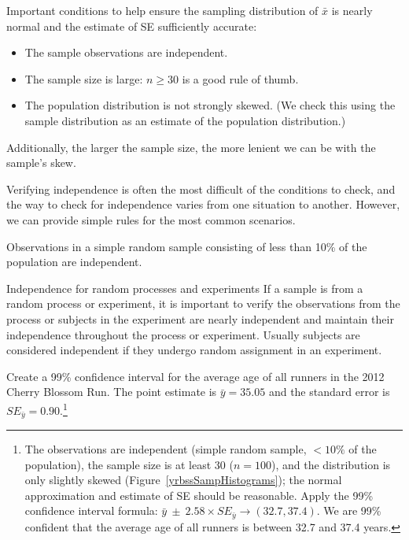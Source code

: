 \begin{termBox}{
Important conditions to help ensure the sampling distribution of $\bar{x}$ is nearly normal and the estimate of SE sufficiently accurate:
\begin{itemize}
\setlength{\itemsep}{0mm}
\item The sample observations are independent.
\item The sample size is large: $n\geq30$ is a good rule of thumb.
\item The population distribution is not strongly skewed. (We check this using the sample distribution as an estimate of the population distribution.)
\end{itemize}
Additionally, the larger the sample size, the more lenient we can be with the sample's skew.}
\end{termBox}

Verifying independence is often the most difficult of the conditions to check, and the way to check for independence varies from one situation to another. However, we can provide simple rules for the most common scenarios. 

\begin{tipBox}{
Observations in a simple random sample consisting of less than 10\% of the population are independent.}
\end{tipBox}

\begin{caution}
{Independence for random processes and experiments}
{If a sample is from a random process or experiment, it is important to verify the observations from the process or subjects in the experiment are nearly independent and maintain their independence throughout the process or experiment. Usually subjects are considered independent if they undergo random assignment in an experiment.}
\end{caution}


\begin{exercise} \label{find99CIForYrbssAgeExercise}
Create a 99\% confidence interval for the average age of all runners in the 2012 Cherry Blossom Run. The point estimate is $\bar{y} = 35.05$ and the standard error is $SE_{\bar{y}} = 0.90$.\footnote{The observations are independent (simple random sample, $<10\%$ of the population), the sample size is at least 30 ($n=100$), and the distribution is only slightly skewed (Figure~\ref{yrbssSampHistograms}); the normal approximation and estimate of SE should be reasonable. Apply the 99\% confidence interval formula: $\bar{y}\ \pm\ 2.58 \times  SE_{\bar{y}} \rightarrow (32.7, 37.4)$. We are 99\% confident that the average age of all runners is between 32.7 and 37.4 years.}
\end{exercise}

